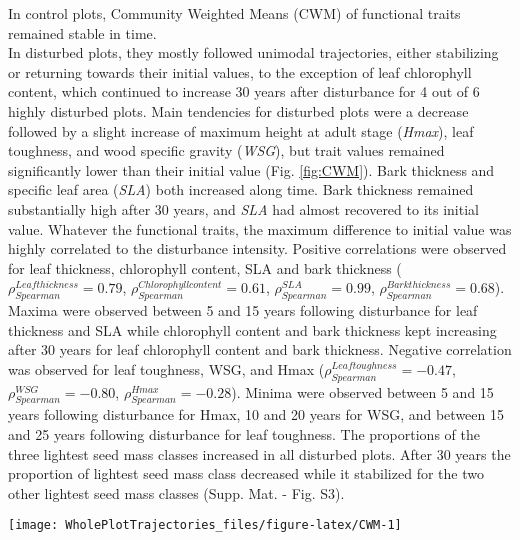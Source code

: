 \documentclass[fleqn,10pt]{ArtEcoFoG} %
\begin{document}
In control plots, Community Weighted Means (CWM) of functional traits
remained stable in time.\\
In disturbed plots, they mostly followed unimodal trajectories, either
stabilizing or returning towards their initial values, to the exception
of leaf chlorophyll content, which continued to increase 30 years after
disturbance for 4 out of 6 highly disturbed plots. \color{red}Main
tendencies for disturbed plots were a decrease followed by a slight
increase of maximum height at adult stage (\emph{Hmax}), leaf toughness,
and wood specific gravity (\emph{WSG}), but trait values remained
significantly lower than their initial value (Fig. \ref{fig:CWM}).
\color{black} Bark thickness and specific leaf area (\emph{SLA}) both
increased along time. Bark thickness remained substantially high after
30 years, and \emph{SLA} had almost recovered to its initial value.
Whatever the functional traits, the maximum difference to initial value
was highly correlated to the disturbance intensity. \color{red}Positive
correlations were observed for leaf thickness, chlorophyll content, SLA
and bark thickness (\(\rho_{Spearman}^{Leaf thickness}=0.79\),
\(\rho_{Spearman}^{Chlorophyll content}=0.61\),
\(\rho_{Spearman}^{SLA}=0.99\),
\(\rho_{Spearman}^{Bark thickness}=0.68\)). Maxima were observed between
5 and 15 years following disturbance for leaf thickness and SLA while
chlorophyll content and bark thickness kept increasing after 30 years
for leaf chlorophyll content and bark thickness. Negative correlation
was observed for leaf toughness, WSG, and Hmax
(\(\rho_{Spearman}^{Leaf toughness}=-0.47\),
\(\rho_{Spearman}^{WSG}=-0.80\), \(\rho_{Spearman}^{Hmax}=-0.28\)).
Minima were observed between 5 and 15 years following disturbance for
Hmax, 10 and 20 years for WSG, and between 15 and 25 years following
disturbance for leaf toughness.\color{black} The proportions of the
three lightest seed mass classes increased in all disturbed plots. After
30 years the proportion of lightest seed mass class decreased while it
stabilized for the two other lightest seed mass classes (Supp. Mat. -
Fig. S3).

\begin{figure*}

{\centering \texttt{[image: WholePlotTrajectories\_files/figure-latex/CWM-1]} 

}

\caption{Trajectories of community weighted means over 30 years after disturbance of four leaf traits (leaf thickness, chlorophyll content, toughness, and specific area), two stem traits (wood specific gravity and bark thickness), and one life history trait (species maximum height at adult stage). }\label{fig:CWM}
\end{figure*}
\end{document}
